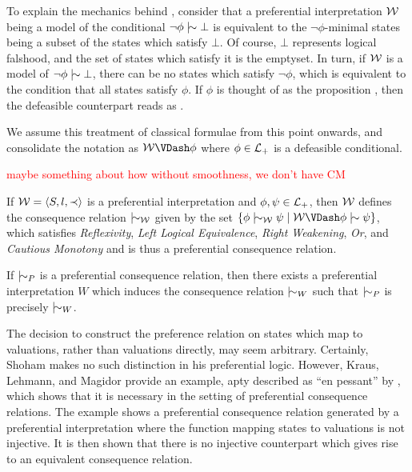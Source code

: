 To explain the mechanics behind , consider that a preferential interpretation $\mathcal{W}$
being a model of the conditional $\neg \phi \twiddle \bot$ is equivalent to the $\neg \phi$-minimal states being a subset
of the states which satisfy $\bot$. Of course, $\bot$ represents logical falshood, and the set of states which satisfy
it is the emptyset. In turn, if $\mathcal{W}$ is a model of $\neg \phi \twiddle \bot$, there can be no states which satisfy $\neg
	\phi$, which is equivalent to the condition that all states satisfy $\phi$. If $\phi$ is thought of as the proposition ,
then the defeasible counterpart reads as 
\cite{kraus1990nonmonotonic,lehmann1992what}.

We assume this treatment of classical formulae from this point onwards, and consolidate the notation as $\pin \VDash \phi$
where $\phi \in \mathcal{L}_+$ is a defeasible conditional.

\textcolor{red}{maybe something about how without smoothness, we don't have CM}

\begin{theorem}[Soundness]
	\label{theorem:soundness-preferential}

	If $\mathcal{W} = \langle S,l,\prec \rangle$ is a preferential interpretation and $\phi, \psi \in \mathcal{L}_+$, then $\mathcal{W}$ defines the consequence relation $\twiddle
		_{\pin}$ given by the set $\{\phi \twiddle_{\pin}\psi \mid \pin \VDash \phi \twiddle \psi\}$, which satisfies \textit{Reflexivity},
	\textit{Left Logical Equivalence}, \textit{Right Weakening}, \textit{Or}, and \textit{Cautious Monotony} and is thus a
	preferential consequence relation.
\end{theorem}

\begin{theorem}[Completeness]
	\label{theorem:completeness-preferential}

	If $\twiddle_{P}$ is a preferential consequence relation, then there exists a preferential interpretation $W$ which induces
	the consequence relation $\twiddle_{W}$ such that $\twiddle_{P}$ is precisely $\twiddle_{W}$.
\end{theorem}

The decision to construct the preference relation on states which map to valuations, rather than valuations directly, may
seem arbitrary. Certainly, Shoham \cite{shohamSemanticApproach} makes no such distinction in his preferential logic.
However, Kraus, Lehmann, and Magidor \cite{kraus1990nonmonotonic} provide an example, apty described as ``en pessant''
by \cite{Bezzazi1997}, which shows that it is necessary in the setting of preferential consequence relations. The
example shows a preferential consequence relation generated by a preferential interpretation where the function mapping
states to valuations is not injective. It is then shown that there is no injective counterpart which gives rise to an equivalent
consequence relation.

